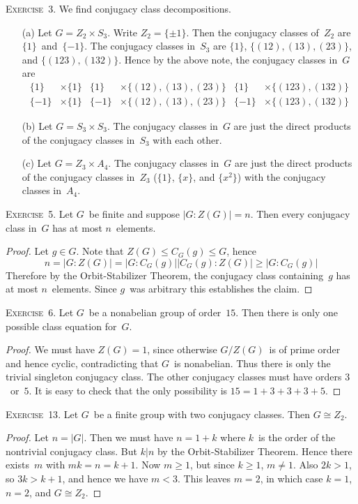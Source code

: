 \documentclass[letterpaper]{article}
\newcommand{\exercise}[1]{\goodbreak\noindent\textsc{Exercise~{#1}.}}
\newcommand{\iso}{\cong}
\newcommand{\subgroup}{\le}
\newcommand{\ord}[1]{|{#1}|}
\newcommand{\gindex}[2]{|{#1}:{#2}|}
\begin{document}
\exercise{3}
We find conjugacy class decompositions.
\begin{enumerate}[itemsep=0pt]
\item[(a)] Let $G=Z_2\times S_3$. Write $Z_2=\{\pm1\}$. Then the conjugacy classes of~$Z_2$ are $\{1\}$~and~$\{-1\}$. The conjugacy classes in~$S_3$ are $\{1\}$, $\{(12),(13),(23)\}$, and $\{(123),(132)\}$. Hence by the above note, the conjugacy classes in~$G$ are
\begin{align*}
\{1\}&\times\{1\}&\{1\}&\times\{(12),(13),(23)\}&\{1\}&\times\{(123),(132)\}\\
\{-1\}&\times\{1\}&\{-1\}&\times\{(12),(13),(23)\}&\{-1\}&\times\{(123),(132)\}
\end{align*}
\item[(b)] Let $G=S_3\times S_3$. The conjugacy classes in~$G$ are just the direct products of the conjugacy classes in~$S_3$ with each other.
\item[(c)] Let $G=Z_3\times A_4$. The conjugacy classes in~$G$ are just the direct products of the conjugacy classes in~$Z_3$ ($\{1\}$, $\{x\}$, and $\{x^2\}$) with the conjugacy classes in~$A_4$.
\end{enumerate}

\exercise{5}
Let $G$~be finite and suppose $\gindex{G}{Z(G)}=n$. Then every conjugacy class in~$G$ has at most $n$~elements.
\begin{proof}
Let $g\in G$. Note that $Z(G)\subgroup C_G(g)\subgroup G$, hence
$$n=\gindex{G}{Z(G)}=\gindex{G}{C_G(g)}\gindex{C_G(g)}{Z(G)}\ge\gindex{G}{C_G(g)}$$
Therefore by the Orbit-Stabilizer Theorem, the conjugacy class containing~$g$ has at most $n$~elements. Since $g$~was arbitrary this establishes the claim.
\end{proof}

\exercise{6}
Let $G$~be a nonabelian group of order~$15$. Then there is only one possible class equation for~$G$.
\begin{proof}
We must have $Z(G)=1$, since otherwise $G/Z(G)$~is of prime order and hence cyclic, contradicting that $G$~is nonabelian. Thus there is only the trivial singleton conjugacy class. The other conjugacy classes must have orders $3$~or~$5$. It is easy to check that the only possibility is $15=1+3+3+3+5$.
\end{proof}

\exercise{13}
Let $G$~be a finite group with two conjugacy classes. Then $G\iso Z_2$.
\begin{proof}
Let $n=\ord{G}$. Then we must have $n=1+k$ where $k$~is the order of the nontrivial conjugacy class. But $k|n$ by the Orbit-Stabilizer Theorem. Hence there exists~$m$ with $mk=n=k+1$. Now $m\ge1$, but since $k\ge1$, $m\ne1$. Also $2k>1$, so $3k>k+1$, and hence we have $m<3$. This leaves $m=2$, in which case $k=1$, $n=2$, and $G\iso Z_2$.
\end{proof}
\end{document}
